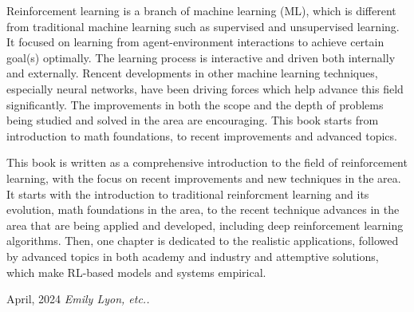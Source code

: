 %
%

\preface
\vspace{-\baselineskip}
\vspace{-\baselineskip}
\vspace{-\baselineskip}
\vspace{-\baselineskip}
\vspace{-\baselineskip}
\vspace{-\baselineskip}
\vspace{-\baselineskip}
\vspace{-\baselineskip}
Reinforcement learning is a branch of machine learning (ML), which is different from traditional machine learning such as supervised and unsupervised learning. 
It focused on learning from agent-environment interactions to achieve certain goal(s) optimally. The learning process is interactive and driven both internally and externally.
Rencent developments in other machine learning techniques, especially neural networks, have been driving forces which help advance this field significantly. 
The improvements in both the scope and the depth of problems being studied and solved in the area are encouraging.
This book starts from introduction to math foundations, to recent improvements and advanced topics.
\vspace{\baselineskip}


\noindent This book is written as a comprehensive introduction to the field of reinforcement learning, with the focus on recent improvements and new techniques in the area. 
It starts with the introduction to traditional reinforcment learning and its evolution, math foundations in the area, to the recent technique advances in the area 
that are being applied and developed, including deep reinforcement learning algorithms. Then, one chapter is dedicated to the realistic applications,
followed by advanced topics in both academy and industry and attemptive solutions, which make RL-based models and systems empirical.



\vspace{\baselineskip}
\begin{flushright}\noindent
April, 2024 \hfill {\it Emily Lyon, etc..}\\
\end{flushright}


